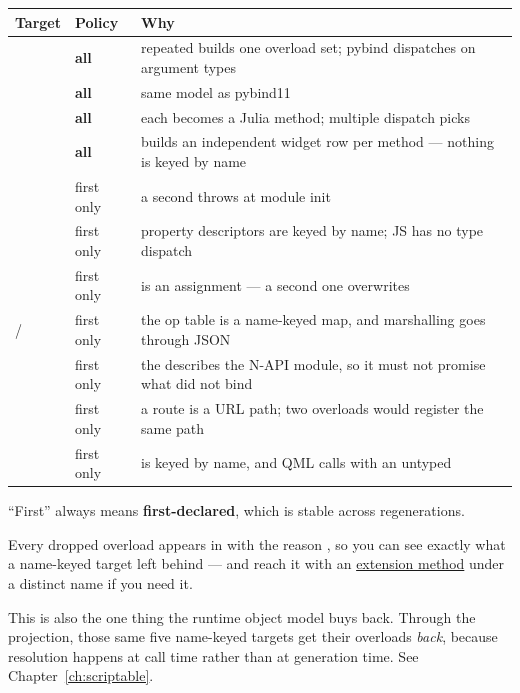 \begin{center}
\small
\begin{tabular}{@{}llL{7.0cm}@{}}
\toprule
\textbf{Target} & \textbf{Policy} & \textbf{Why} \\
\midrule
{} & \textbf{all} & repeated  builds one
  overload set; pybind dispatches on argument types \\
 & \textbf{all} & same model as pybind11 \\
 & \textbf{all} & each becomes a Julia method; multiple dispatch
  picks \\
 & \textbf{all} & builds an independent widget row per method ---
  nothing is keyed by name \\
\addlinespace
{} & first only & a second  throws
   at module init \\
 & first only & property descriptors are keyed by name; JS has no
  type dispatch \\
 & first only &  is an assignment --- a second
  one overwrites \\
 /  & first only & the op table is a name-keyed map, and
  marshalling goes through JSON \\
 & first only & the  describes the N-API module, so
  it must not promise what  did not bind \\
 & first only & a route is a URL path; two overloads would register
  the same path \\
 & first only &  is keyed by name, and QML calls
  with an untyped  \\
\bottomrule
\end{tabular}
\end{center}

``First'' always means \textbf{first-declared}, which is stable across
regenerations.

Every dropped overload appears in  with the reason
, so you can see exactly what a name-keyed
target left behind --- and reach it with an
\hyperref[sec:extensions]{extension method} under a distinct name if you need
it.

\begin{note}
This is also the one thing the runtime object model buys back. Through the
 projection, those same five name-keyed targets get their
overloads \emph{back}, because resolution happens at call time rather than at
generation time. See Chapter~\ref{ch:scriptable}.
\end{note}

